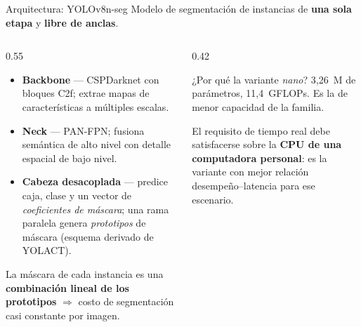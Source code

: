 \documentclass[aspectratio=169,11pt]{beamer}
\begin{document}
\begin{frame}{Arquitectura: YOLOv8n-seg}
  Modelo de segmentación de instancias de \textbf{una sola etapa} y \textbf{libre de anclas}.

  \vspace{0.5em}
  \begin{columns}[T]
    \begin{column}{0.55\textwidth}
      \begin{itemize}\footnotesize
        \item \textbf{Backbone} --- CSPDarknet con bloques C2f; extrae mapas de
              características a múltiples escalas.
        \item \textbf{Neck} --- PAN-FPN; fusiona semántica de alto nivel con detalle
              espacial de bajo nivel.
        \item \textbf{Cabeza desacoplada} --- predice caja, clase y un vector de
              \emph{coeficientes de máscara}; una rama paralela genera \emph{prototipos}
              de máscara (esquema derivado de YOLACT).
      \end{itemize}
      \vspace{0.4em}
      {\footnotesize La máscara de cada instancia es una \textbf{combinación lineal de los
      prototipos} $\Rightarrow$ costo de segmentación casi constante por imagen.}
    \end{column}
    \begin{column}{0.42\textwidth}
      \begin{block}{¿Por qué la variante \emph{nano}?}
        \footnotesize
        3,26~M de parámetros, 11,4~GFLOPs. Es la de menor capacidad de la familia.
        \vspace{0.4em}

        El requisito de tiempo real debe satisfacerse sobre la \textbf{CPU de una
        computadora personal}: es la variante con mejor relación
        desempeño--latencia para ese escenario.
      \end{block}
    \end{column}
  \end{columns}
\end{frame}
\end{document}

